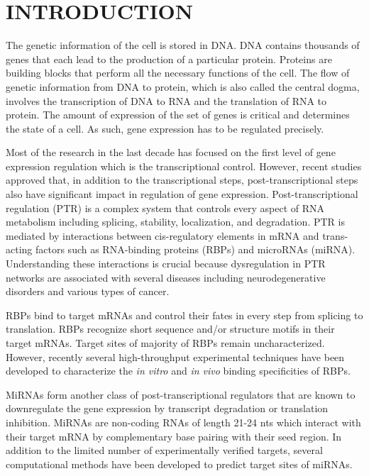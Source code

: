 \chapter{INTRODUCTION}
\label{chp:introduction}

The genetic information of the cell is stored in DNA. DNA contains thousands of genes that each lead to the production of a particular protein. Proteins are building blocks that perform all the necessary functions of the cell. The flow of genetic information from DNA to protein, which is also called the central dogma, involves the transcription of DNA to RNA and the translation of RNA to protein. The amount of expression of the set of genes is critical and determines the state of a cell. As such, gene expression has to be regulated precisely.

Most of the research in the last decade has focused on the first level of gene expression regulation which is the transcriptional control. However, recent studies approved that, in addition to the transcriptional steps, post-transcriptional steps also have significant impact in regulation of gene expression. Post-transcriptional regulation (PTR) is a complex system that controls every aspect of RNA metabolism including splicing, stability, localization, and degradation. PTR is mediated by interactions between cis-regulatory elements in mRNA and trans-acting factors such as RNA-binding proteins (RBPs) and microRNAs (miRNA). Understanding these interactions is crucial because dysregulation in PTR networks are associated with several diseases including neurodegenerative disorders and various types of cancer.

RBPs bind to target mRNAs and control their fates in every step from splicing to translation.  RBPs recognize short sequence and/or structure motifs in their target mRNAs. Target sites of majority of RBPs remain uncharacterized. However, recently several high-throughput experimental techniques have been developed to characterize the \textit{in vitro} and \textit{in vivo} binding specificities of RBPs. 

MiRNAs form another class of post-transcriptional regulators that are known to downregulate the gene expression by transcript degradation or translation inhibition. MiRNAs are non-coding RNAs of length 21-24 nts which interact with their target mRNA by complementary base pairing with their seed region. In addition to the limited number of experimentally verified targets, several computational methods have been developed to predict target sites of miRNAs. 

